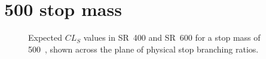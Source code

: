 \FloatBarrier

\newpage
\section{500 \texorpdfstring{\GeV}{GeV} stop mass}

\begin{figure}[ht]
  \centering
  \caption{
    Expected $CL_S$ values in SR~400 and SR~600 for a stop mass of 500~\GeV,
    shown across the plane of physical stop branching ratios.
  }
\end{figure}

